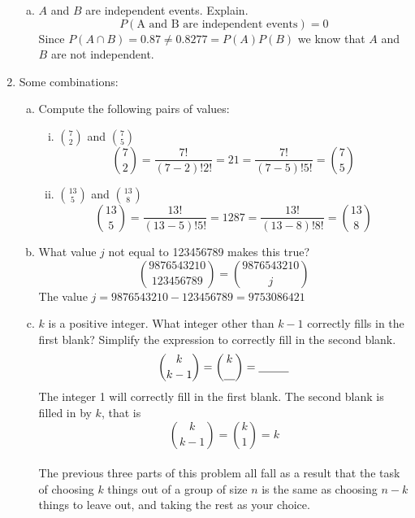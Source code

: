 \documentclass{scrartcl}
\begin{document}
\begin{enumerate}
\begin{enumerate}[a)]
\item $A$ and $B$ are independent events. Explain.\\
$$P(\text{A and B are independent events}) = 0$$
Since $P(A \cap B) = 0.87 \ne 0.8277 = P(A)P(B)$ we know that $A$ and $B$ are not independent.
\end{enumerate}

\item Some combinations:

\begin{enumerate}[a)]

\item Compute the following pairs of values:
\begin{enumerate}[i)]
\item $7 \choose 2$ and $7 \choose 5$
\begin{displaymath}
{7 \choose 2} = \frac{7!}{(7-2)!2!} = 21 = \frac{7!}{(7-5)!5!} = {7 \choose 5}
\end{displaymath}

\item $13 \choose 5$ and $13 \choose 8$
\begin{displaymath}
{13 \choose 5} = \frac{13!}{(13-5)!5!} = 1287 = \frac{13!}{(13-8)!8!} = {13 \choose 8}
\end{displaymath}
\end{enumerate}

\item What value $j$ not equal to 123456789 makes this true?
\begin{displaymath}
  {9876543210 \choose 123456789} = {9876543210 \choose j}
\end{displaymath}
The value $j = 9876543210-123456789 = 9753086421$

\item $k$ is a positive integer. What integer other than $k-1$ correctly fills in the first blank? Simplify the expression to correctly fill in the second blank.
\begin{displaymath}
  {k \choose k-1} = {k \choose \text{\underline{\ \ \ }}} = \text{\underline{\ \ \ \ \ \ \ \ }}
\end{displaymath}
The integer 1 will correctly fill in the first blank. The second blank is filled in by $k$, that is $${k \choose k-1}={k \choose 1}=k$$\\

The previous three parts of this problem all fall as a result that the task of choosing $k$ things out of a group of size $n$ is the same as choosing $n-k$ things to leave out, and taking the rest as your choice.


\end{enumerate}
\end{enumerate}
\end{document}
